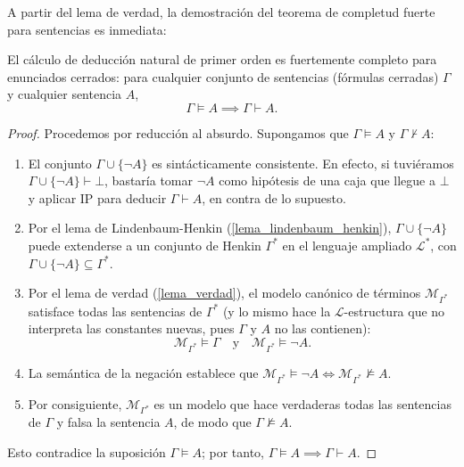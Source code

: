 A partir del lema de verdad, la demostración del teorema de completud
fuerte para sentencias es inmediata:

\begin{theorem}
El cálculo de deducción natural de primer orden es fuertemente completo para enunciados cerrados: para cualquier conjunto de sentencias (fórmulas cerradas) $\Gamma$ y cualquier sentencia $A$,
\[
\Gamma \models A \implies \Gamma \vdash A.
\]
\end{theorem}

\begin{proof}
Procedemos por reducción al absurdo. Supongamos que $\Gamma \models A$ y $\Gamma \nvdash A$:
\begin{enumerate}
    \item El conjunto $\Gamma \cup \{\neg A\}$ es sintácticamente consistente. En efecto, si tuviéramos $\Gamma \cup \{\neg A\} \vdash \bot$, bastaría tomar $\neg A$ como hipótesis de una caja que llegue a $\bot$ y aplicar IP para deducir $\Gamma \vdash A$, en contra de lo supuesto.
    \item Por el lema de Lindenbaum-Henkin (\ref{lema_lindenbaum_henkin}), $\Gamma \cup \{\neg A\}$ puede extenderse a un conjunto de Henkin $\Gamma^*$ en el lenguaje ampliado $\mathcal{L}^*$, con $\Gamma \cup \{\neg A\} \subseteq \Gamma^*$.
    \item Por el lema de verdad (\ref{lema_verdad}), el modelo
      canónico de términos $\mathcal{M}_{\Gamma^*}$ satisface todas
      las sentencias de $\Gamma^*$ (y lo mismo hace la
      $\mathcal{L}$-estructura que no interpreta las constantes nuevas, pues $\Gamma$ y $A$ no las contienen):
    \[
    \mathcal{M}_{\Gamma^*} \models \Gamma \quad \text{y} \quad \mathcal{M}_{\Gamma^*} \models \neg A.
    \]
    \item La semántica de la negación establece que $\mathcal{M}_{\Gamma^*} \models \neg A \iff \mathcal{M}_{\Gamma^*} \not\models A$.
    \item Por consiguiente, $\mathcal{M}_{\Gamma^*}$ es un modelo que
      hace verdaderas todas las sentencias de $\Gamma$ y falsa la
      sentencia $A$, de modo que $\Gamma
      \not\models A$. 
\end{enumerate}
Esto contradice la suposición $\Gamma \models A$; por tanto, $\Gamma \models A \implies \Gamma \vdash A$.
\end{proof}


